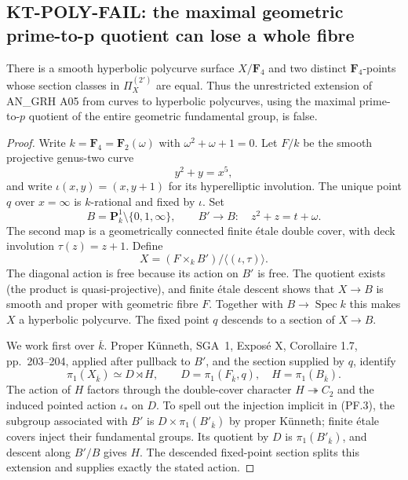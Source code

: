 \subsection{KT-POLY-FAIL: the maximal geometric prime-to-p quotient
can lose a whole fibre}
\label{sec:kt-poly-fail}

\begin{proposition}
There is a smooth hyperbolic polycurve surface $X/\mathbf F_4$
and two distinct $\mathbf F_4$-points whose section classes in
$\Pi_X^{(2')}$ are equal. Thus the unrestricted extension of
AN\_GRH A05 from curves to hyperbolic polycurves, using the
maximal prime-to-$p$ quotient of the entire geometric fundamental
group, is false.
\end{proposition}

\begin{proof}
Write $k=\mathbf F_4=\mathbf F_2(\omega)$ with
$\omega^2+\omega+1=0$. Let $F/k$ be the smooth projective
genus-two curve
\[
 y^2+y=x^5,
\]
and write $\iota(x,y)=(x,y+1)$ for its hyperelliptic
involution. The unique point $q$ over $x=\infty$ is $k$-rational
and fixed by $\iota$. Set
\[
 B=\mathbf P^1_k\setminus\{0,1,\infty\},\qquad
 B'\longrightarrow B:\quad z^2+z=t+\omega.
                                                               \tag{PF.1}
\]
The second map is a geometrically connected finite \'etale
double cover, with deck involution $\tau(z)=z+1$.
Define
\[
 X=(F\times_k B')/\langle(\iota,\tau)\rangle.
                                                               \tag{PF.2}
\]
The diagonal action is free because its action on $B'$ is free.
The quotient exists (the product is quasi-projective), and finite
\'etale descent shows that $X\to B$ is smooth and proper with
geometric fibre $F$. Together with $B\to\operatorname{Spec}k$
this makes $X$ a hyperbolic polycurve. The fixed point $q$ descends
to a section of $X\to B$.

We work first over $\overline k$. Proper K\"unneth, SGA~1,
Expos\'e X, Corollaire 1.7, pp.~203--204, applied after pullback
to $B'$, and the section supplied by $q$, identify
\[
 \pi_1(X_{\overline k})\simeq
 D\rtimes H,\qquad
 D=\pi_1(F_{\overline k},q),\quad H=\pi_1(B_{\overline k}).
                                                               \tag{PF.3}
\]
The action of $H$ factors through the double-cover character
$H\twoheadrightarrow C_2$ and the induced pointed action
$\iota_*$ on $D$. To spell out the injection implicit in
(PF.3), the subgroup associated with $B'$ is
$D\times\pi_1(B'_{\overline k})$ by proper K\"unneth;
finite \'etale covers inject their fundamental groups. Its
quotient by $D$ is $\pi_1(B'_{\overline k})$, and descent along
$B'/B$ gives $H$. The descended fixed-point section splits this
extension and supplies exactly the stated action.


\end{proof}
